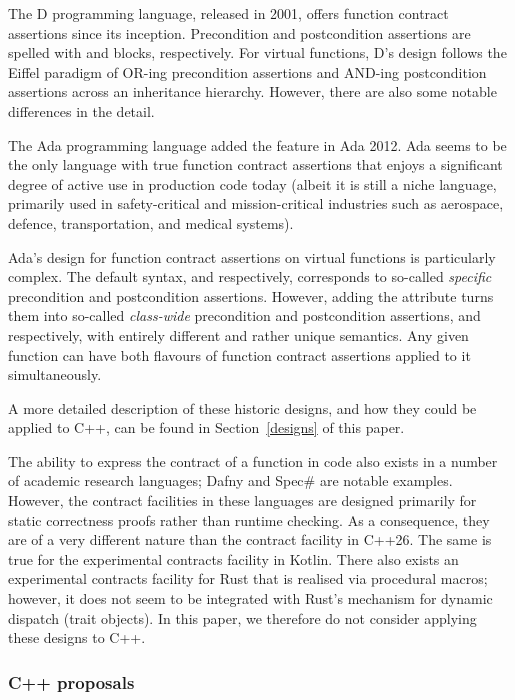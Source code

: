 The D programming language, released in 2001, offers function contract assertions since its inception. Precondition and postcondition assertions are spelled with  and  blocks, respectively. For virtual functions, D's design follows the Eiffel paradigm of OR-ing precondition assertions and AND-ing postcondition assertions across an inheritance hierarchy. However, there are also some notable differences in the detail.

The Ada programming language added the feature in Ada 2012. Ada seems to be the only language with true function contract assertions that enjoys a significant degree of active use in production code today (albeit it is still a niche language, primarily used in safety-critical and mission-critical industries such as aerospace, defence, transportation, and medical systems).

Ada's design for function contract assertions on virtual functions is particularly complex. The default syntax,  and  respectively, corresponds to so-called \emph{specific} precondition and postcondition assertions. However, adding the  attribute turns them into so-called  \emph{class-wide} precondition and postcondition assertions,  and  respectively, with entirely different and rather unique semantics. Any given function can have both flavours of function contract assertions applied to it simultaneously.

A more detailed description of these historic designs, and how they could be applied to C++, can be found in Section~\ref{designs} of this paper.

The ability to express the contract of a function in code also exists in a number of academic research languages; Dafny and Spec\# are notable examples. However, the contract facilities in these languages are designed primarily for static correctness proofs rather than runtime checking. As a consequence, they are of a very different nature than the contract facility in C++26. The same is true for the experimental contracts facility in Kotlin. There also exists an experimental contracts facility for Rust that is realised via procedural macros; however, it does not seem to be integrated with Rust's mechanism for dynamic dispatch (trait objects). In this paper, we therefore do not consider applying these designs to C++.

\subsubsection{C++ proposals}

